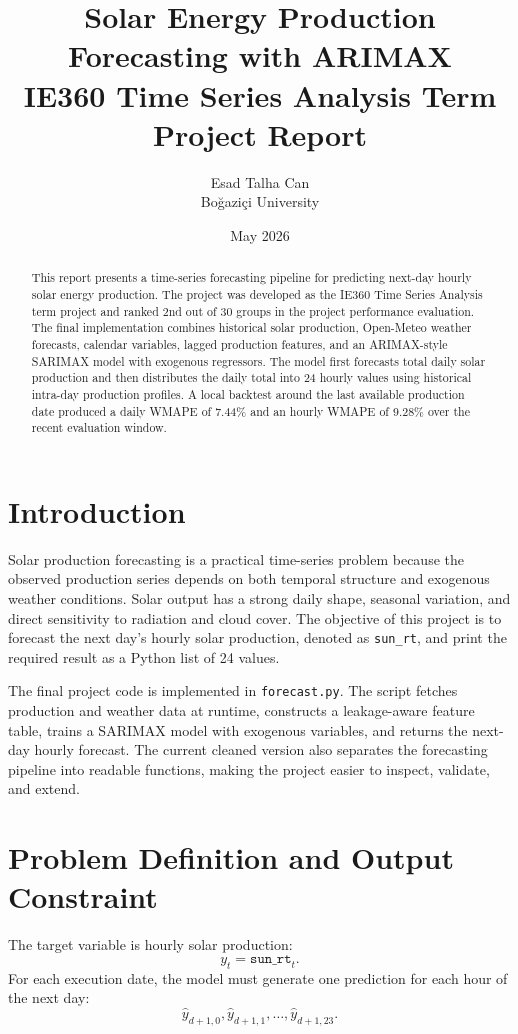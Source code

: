 \documentclass[11pt]{article}
\title{\textbf{Solar Energy Production Forecasting with ARIMAX}\\
\large IE360 Time Series Analysis Term Project Report}
\author{Esad Talha Can\\
Boğaziçi University}
\date{May 2026}
\begin{document}
\maketitle

\begin{abstract}
This report presents a time-series forecasting pipeline for predicting next-day
hourly solar energy production. The project was developed as the IE360 Time
Series Analysis term project and ranked 2nd out of 30 groups in the project
performance evaluation. The final implementation combines historical solar
production, Open-Meteo weather forecasts, calendar variables, lagged production
features, and an ARIMAX-style SARIMAX model with exogenous regressors. The model
first forecasts total daily solar production and then distributes the daily total
into 24 hourly values using historical intra-day production profiles. A local
backtest around the last available production date produced a daily WMAPE of
7.44\% and an hourly WMAPE of 9.28\% over the recent evaluation window.
\end{abstract}

\section{Introduction}

Solar production forecasting is a practical time-series problem because the
observed production series depends on both temporal structure and exogenous
weather conditions. Solar output has a strong daily shape, seasonal variation,
and direct sensitivity to radiation and cloud cover. The objective of this
project is to forecast the next day's hourly solar production, denoted as
\texttt{sun\_rt}, and print the required result as a Python list of 24 values.

The final project code is implemented in \texttt{forecast.py}. The script fetches
production and weather data at runtime, constructs a leakage-aware feature
table, trains a SARIMAX model with exogenous variables, and returns the next-day
hourly forecast. The current cleaned version also separates the forecasting
pipeline into readable functions, making the project easier to inspect,
validate, and extend.

\section{Problem Definition and Output Constraint}

The target variable is hourly solar production:
\[
    y_t = \texttt{sun\_rt}_t.
\]
For each execution date, the model must generate one prediction for each hour of
the next day:
\[
    \hat{y}_{d+1,0}, \hat{y}_{d+1,1}, \ldots, \hat{y}_{d+1,23}.
\]
\end{document}
